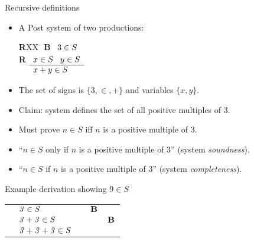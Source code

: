 \begin{wideslide}[bm=,toc=]{Recursive definitions}
\begin{itemize}
\item A Post system of two productions:
\vspace{-1em}
\begin{tabbing}
{\bf R}XX \=  \kill
{\bf B} \>
        \(\begin{array}[t]{l}
        3\in S
        \end{array}\) \\[2ex]
{\bf R} \>
        \(\begin{array}[t]{l}
        x \in S \;\;\;y \in S \\
        \hline
        x + y \in S
        \end{array}\)
\end{tabbing}
\item The set of signs is $\{3,\in,+\}$ and variables $\{x,y\}$.
\item Claim: system defines the set of all positive multiples of 3.
\item Must prove $n\in S$ iff $n$ is a positive multiple of 3.
\item ``$n\in S$ only if $n$ is a positive multiple of 3'' (system {\em soundness\/}).
\item ``$n\in S$ if $n$ is a positive multiple of 3'' (system {\em completeness\/}).
\end{itemize}
\end{wideslide}
\begin{wideslide}[bm=,toc=]{Example derivation showing $9 \in S$}
\begin{center}
\begin{tabular}{lllll}
  \onslide{2-}{$\bid{B}$  & $\id{3}\in \id{S}$}           & \onslide{3-}{$\id{3}\in \id{S}$ & $\bid{B}$}
  \onslide{4-}{\\ \cline{2-3}}
  \onslide{5-}{$\bid{R}$  & $\mbox{\it 3\/} + \mbox{\it 3\/} \in \mbox{\it S\/}$} &                    & \onslide{6-}{$\id{3}\in \id{S}$ & $\bid{B}$} 
  \onslide{7-}{\\ \cline{2-4}} 
  \onslide{8-}{$\bid{R}$  & $\mbox{\it 3\/} + \mbox{\it 3\/} + \mbox{\it 3\/} \in \mbox{\it S\/}$ &           & &  \\} 
\end{tabular}
\end{center}

\end{wideslide}
